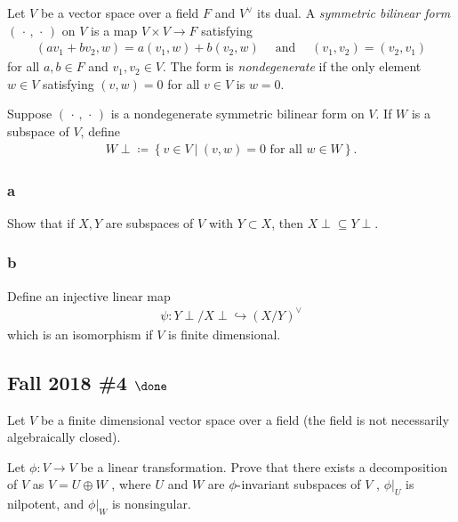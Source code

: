 Let \(V\) be a vector space over a field \(F\) and \(V^\vee\) its dual.
A \emph{symmetric bilinear form} \(({\,\cdot\,}, {\,\cdot\,})\) on \(V\)
is a map \(V\times V\to F\) satisfying
\begin{align*}
(av_1 + b v_2, w) = a(v_1, w) + b(v_2, w) {\quad \operatorname{and} \quad} (v_1, v_2) = (v_2, v_1)
\end{align*}
for all \(a, b\in F\) and \(v_1, v_2 \in V\). The form is
\emph{nondegenerate} if the only element \(w\in V\) satisfying
\((v, w) = 0\) for all \(v\in V\) is \(w=0\).

Suppose \(({\,\cdot\,}, {\,\cdot\,})\) is a nondegenerate symmetric
bilinear form on \(V\). If \(W\) is a subspace of \(V\), define
\begin{align*}
W\perp \coloneqq\left\{{v\in V {~\mathrel{\Big|}~}(v, w) = 0 \text{ for all } w\in W}\right\}
.\end{align*}

\hypertarget{a-100}{%
\subsubsection{a}\label{a-100}}

Show that if \(X, Y\) are subspaces of \(V\) with \(Y\subset X\), then
\(X\perp \subseteq Y\perp\).

\hypertarget{b-90}{%
\subsubsection{b}\label{b-90}}

Define an injective linear map
\begin{align*}
\psi: Y\perp/X\perp \hookrightarrow(X/Y)^\vee
\end{align*}
which is an isomorphism if \(V\) is finite dimensional.

\hypertarget{fall-2018-4-done}{%
\subsection{\texorpdfstring{Fall 2018 \#4
\(\done\)}{Fall 2018 \#4 \textbackslash done}}\label{fall-2018-4-done}}

Let \(V\) be a finite dimensional vector space over a field (the field
is not necessarily algebraically closed).

Let \(\phi : V \to V\) be a linear transformation. Prove that there
exists a decomposition of \(V\) as \(V = U \oplus W\) , where \(U\) and
\(W\) are \(\phi{\hbox{-}}\)invariant subspaces of \(V\) ,
\({\left.{{\phi}} \right|_{{U}} }\) is nilpotent, and
\({\left.{{\phi}} \right|_{{W}} }\) is nonsingular.

